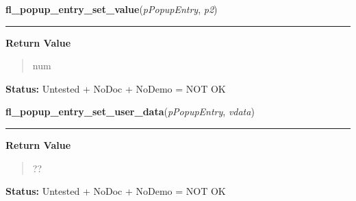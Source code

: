     \vspace{0.5ex}

\hspace{.8\funcindent}\begin{boxedminipage}{\funcwidth}

    \raggedright \textbf{fl\_popup\_entry\_set\_value}(\textit{pPopupEntry}, \textit{p2})

    \vspace{-1.5ex}

    \rule{\textwidth}{0.5\fboxrule}
\setlength{\parskip}{2ex}
\setlength{\parskip}{1ex}
      \textbf{Return Value}
    \vspace{-1ex}

      \begin{quote}
      num

      \end{quote}

\textbf{Status:} Untested + NoDoc + NoDemo = NOT OK



    \end{boxedminipage}

    \label{xformslib:flpopup:fl_popup_entry_set_user_data}

    \vspace{0.5ex}

\hspace{.8\funcindent}\begin{boxedminipage}{\funcwidth}

    \raggedright \textbf{fl\_popup\_entry\_set\_user\_data}(\textit{pPopupEntry}, \textit{vdata})

    \vspace{-1.5ex}

    \rule{\textwidth}{0.5\fboxrule}
\setlength{\parskip}{2ex}
\setlength{\parskip}{1ex}
      \textbf{Return Value}
    \vspace{-1ex}

      \begin{quote}
      ??

      \end{quote}

\textbf{Status:} Untested + NoDoc + NoDemo = NOT OK



    \end{boxedminipage}

